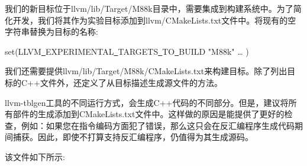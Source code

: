 我们的新目标位于llvm/lib/Target/M88k目录中，需要集成到构建系统中。为了简化开发，我们将其作为实验目标添加到llvm/CMakeLists.txt文件中。将现有的空字符串替换为目标的名称:\par

\begin{tcolorbox}[colback=white,colframe=black]
set(LLVM\underline{~}EXPERIMENTAL\underline{~}TARGETS\underline{~}TO\underline{~}BUILD "M88k" … )
\end{tcolorbox}

我们还需要提供llvm/lib/Target/M88k/CMakeLists.txt来构建目标。除了列出目标的C++文件外，还定义了从目标描述生成源文件的方法。\par

\begin{tcolorbox}[colback=blue!5!white,colframe=blue!75!black, title=从目标描述生成所有类型的源码]
llvm-tblgen工具的不同运行方式，会生成C++代码的不同部分。但是，建议将所有部件的生成添加到CMakeLists.txt文件中。这样做的原因是能提供了更好的检查，例如：如果您在指令编码方面犯了错误，那么这只会在反汇编程序生成代码期间捕获。因此，即使不打算支持反汇编程序，仍值得为其生成源码。	
\end{tcolorbox}

该文件如下所示:\par

